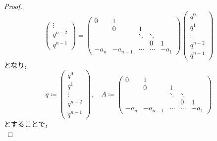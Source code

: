 \documentclass[b5paper,draft,oneside,openany]{ltjsbook} %
\begin{document}
\begin{prop}[定数係数線型斉次常微分方程式の解の存在と一意性]
\begin{proof}
\begin{equation}
\begin{pmatrix}
                \vdots
                \\
                q^{n-2}
                \\
                q^{n-1}
            \end{pmatrix}
            =
            \begin{pmatrix}
                0 & 1 &&&
                \\
                 & 0 & 1 & &
                \\
                 &  & \ddots & \ddots &
                \\
                 &  & & 0 & 1
                \\
                -a_n & -a_{n-1} & \cdots & \cdots & -a_1
            \end{pmatrix}
            \begin{pmatrix}
                q^0
                \\
                q^1
                \\
                \vdots
                \\
                q^{n-2}
                \\
                q^{n-1}
            \end{pmatrix}
        \end{equation}
        となり，
        \begin{equation}
            q\coloneqq\begin{pmatrix}
                q^0
                \\
                q^1
                \\
                \vdots
                \\
                q^{n-2}
                \\
                q^{n-1}
            \end{pmatrix},\quad
            A\coloneqq\begin{pmatrix}
                0 & 1 &&&
                \\
                 & 0 & 1 & &
                \\
                 &  & \ddots & \ddots &
                \\
                 &  & & 0 & 1
                \\
                -a_n & -a_{n-1} & \cdots & \cdots & -a_1
            \end{pmatrix}
        \end{equation}
        とすることで，
        \begin{equation}

\end{equation}
\end{proof}
\end{prop}
\end{document}
